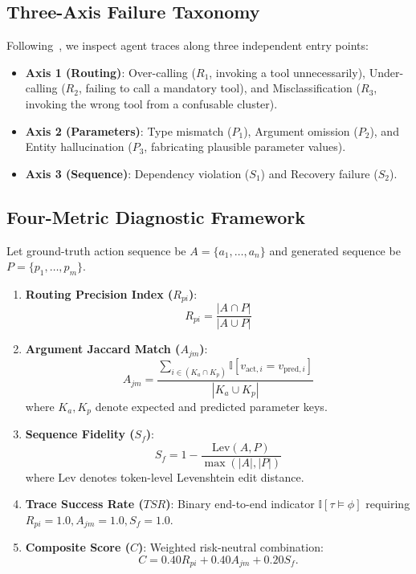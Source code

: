 \documentclass[10pt,journal,compsoc]{IEEEtran}
\begin{document}
\subsection{Three-Axis Failure Taxonomy}
Following~\cite{chouhan2026evaluating}, we inspect agent traces along three independent entry points:
\begin{itemize}
    \item \textbf{Axis 1 (Routing)}: Over-calling ($R_1$, invoking a tool unnecessarily), Under-calling ($R_2$, failing to call a mandatory tool), and Misclassification ($R_3$, invoking the wrong tool from a confusable cluster).
    \item \textbf{Axis 2 (Parameters)}: Type mismatch ($P_1$), Argument omission ($P_2$), and Entity hallucination ($P_3$, fabricating plausible parameter values).
    \item \textbf{Axis 3 (Sequence)}: Dependency violation ($S_1$) and Recovery failure ($S_2$).
\end{itemize}

\subsection{Four-Metric Diagnostic Framework}
Let ground-truth action sequence be $A = \{a_1, \dots, a_n\}$ and generated sequence be $P = \{p_1, \dots, p_m\}$.
\begin{enumerate}
    \item \textbf{Routing Precision Index ($R_{pi}$)}:
    \begin{equation}
    R_{pi} = \frac{|A \cap P|}{|A \cup P|}
    \end{equation}
    \item \textbf{Argument Jaccard Match ($A_{jm}$)}:
    \begin{equation}
    A_{jm} = \frac{\sum_{i \in (K_a \cap K_p)} \mathbb{I}[v_{\text{act}, i} = v_{\text{pred}, i}]}{|K_a \cup K_p|}
    \end{equation}
    where $K_a, K_p$ denote expected and predicted parameter keys.
    \item \textbf{Sequence Fidelity ($S_f$)}:
    \begin{equation}
    S_f = 1 - \frac{\text{Lev}(A, P)}{\max(|A|, |P|)}
    \end{equation}
    where $\text{Lev}$ denotes token-level Levenshtein edit distance.
    \item \textbf{Trace Success Rate ($TSR$)}: Binary end-to-end indicator $\mathbb{I}[\tau \models \phi]$ requiring $R_{pi} = 1.0, A_{jm} = 1.0, S_f = 1.0$.
    \item \textbf{Composite Score ($C$)}: Weighted risk-neutral combination:
    \begin{equation}
    C = 0.40 R_{pi} + 0.40 A_{jm} + 0.20 S_f.
    \end{equation}
\end{enumerate}
\end{document}
